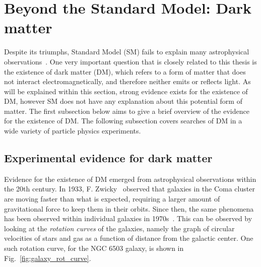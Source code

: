 \section{Beyond the Standard Model: Dark matter}

\graphicspath{{1_TheoreticalBackground/Figures/DM}}

Despite its triumphs, Standard Model (SM) fails to explain many astrophysical observations~\cite{Bertone:2004pz}.
One very important question that is closely related to this thesis is the existence of dark matter (DM), which
refers to a form of matter that does not interact electromagnetically, and therefore neither emits or reflects light.
As will be explained within this section, strong evidence exists for the existence of DM, however SM
does not have any explanation about this potential form of matter.
The first subsection below aims to give a brief overview of the evidence for the existence of DM.
The following subsection covers searches of DM in a wide variety of particle physics experiments.

\subsection{Experimental evidence for dark matter}
\label{subsec:dm_evidence}

Evidence for the existence of DM emerged from astrophysical observations within the 20th century. In 1933,
F. Zwicky~\cite{Zwicky:1933gu} observed that galaxies in the Coma cluster are moving faster than what
is expected, requiring a larger amount of gravitational force to keep them in their orbits. Since then, the
same phenomena has been observed within individual galaxies in 1970s~\cite{Bertone:2004pz}. This can be observed
by looking at the \textit{rotation curves} of the galaxies, namely the graph of circular velocities of stars and gas
as a function of distance from the galactic center. One such rotation curve, for the NGC 6503 galaxy, is shown in
Fig.~\ref{fig:galaxy_rot_curve}.

